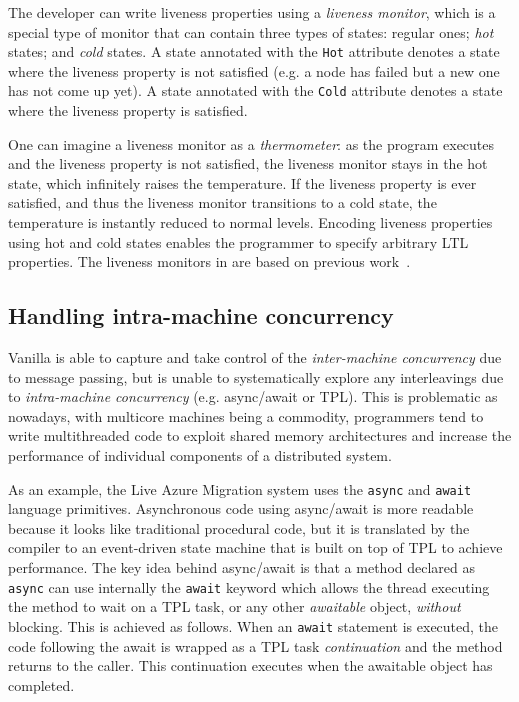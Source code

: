 The \psharp developer can write liveness properties using a \emph{liveness monitor}, which is a special type of monitor that can contain three types of states: regular ones; \emph{hot} states; and \emph{cold} states. A state annotated with the \texttt{Hot} attribute denotes a state where the liveness property is not satisfied (e.g. a node has failed but a new one has not come up yet). A state annotated with the \texttt{Cold} attribute denotes a state where the liveness property is satisfied.

One can imagine a liveness monitor as a \emph{thermometer}: as the program executes and the liveness property is not satisfied, the liveness monitor stays in the hot state, which infinitely raises the temperature. If the liveness property is ever satisfied, and thus the liveness monitor transitions to a cold state, the temperature is instantly reduced to normal levels. Encoding liveness properties using hot and cold states enables the programmer to specify arbitrary LTL properties. The liveness monitors in \psharp are based on previous work~\cite{?}. 



\subsection{Handling intra-machine concurrency}
\label{sec:psharp:async}

Vanilla \psharp is able to capture and take control of the \emph{inter-machine concurrency} due to message passing, but is unable to systematically explore any interleavings due to \emph{intra-machine concurrency} (e.g. async/await or TPL). This is problematic as nowadays, with multicore machines being a commodity, programmers tend to write multithreaded code to exploit shared memory architectures and increase the performance of individual components of a distributed system.

As an example, the Live Azure Migration system uses the \texttt{async} and \texttt{await}  language primitives. Asynchronous code using async/await is more readable because it looks like traditional procedural code, but it is translated by the compiler to an event-driven state machine that is built on top of TPL to achieve performance. The key idea behind async/await is that a method declared as \texttt{async} can use internally the \texttt{await} keyword which allows the thread executing the method to wait on a TPL task, or any other \emph{awaitable} object, \emph{without} blocking. This is achieved as follows. When an \texttt{await} statement is executed, the code following the await is wrapped as a TPL task \emph{continuation} and the method returns to the caller. This continuation executes when the awaitable object has completed.

